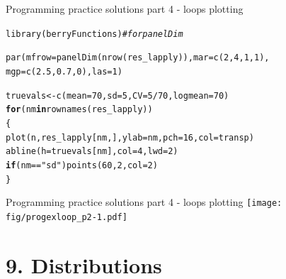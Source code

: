 \documentclass[xcolor=table,       handout,    xcolor=dvipsnames]{beamer}\usepackage[]{graphicx}\usepackage[]{color}
\makeatletter
\newcommand{\hlnum}[1]{\textcolor[rgb]{0,0,0}{#1}}
\newcommand{\hlstr}[1]{\textcolor[rgb]{0.545,0.137,0.137}{#1}}
\newcommand{\hlcom}[1]{\textcolor[rgb]{0,0.392,0}{\textit{#1}}}
\newcommand{\hlopt}[1]{\textcolor[rgb]{0,0,0}{#1}}
\newcommand{\hlstd}[1]{\textcolor[rgb]{0,0,0}{#1}}
\newcommand{\hlkwa}[1]{\textcolor[rgb]{1,0,0}{\textbf{#1}}}
\newcommand{\hlkwb}[1]{\textcolor[rgb]{0,0,0}{#1}}
\newcommand{\hlkwc}[1]{\textcolor[rgb]{1,0,1}{#1}}
\newcommand{\hlkwd}[1]{\textcolor[rgb]{0,0,1}{#1}}
\newenvironment{kframe}{%
 \def\at@end@of@kframe{}%
 \ifinner\ifhmode%
  \def\at@end@of@kframe{\end{minipage}}%
  \begin{minipage}{\columnwidth}%
 \fi\fi%
 \def\FrameCommand##1{\hskip\@totalleftmargin \hskip-\fboxsep
 \colorbox{shadecolor}{##1}\hskip-\fboxsep
     \hskip-\linewidth \hskip-\@totalleftmargin \hskip\columnwidth}%
 \MakeFramed {\advance\hsize-\width
   \@totalleftmargin\z@ \linewidth\hsize
   \@setminipage}}%
 {\par\unskip\endMakeFramed%
 \at@end@of@kframe}
\newenvironment{knitrout}{}{} %
\makeatother
\begin{document}
\begin{frame}[fragile]{Programming practice solutions part 4 - loops plotting}
\begin{knitrout}
\color{fgcolor}\begin{kframe}
\begin{alltt}
\hlkwd{library}\hlstd{(berryFunctions)} \hlcom{# for panelDim}

\hlkwd{par}\hlstd{(}\hlkwc{mfrow}\hlstd{=}\hlkwd{panelDim}\hlstd{(}\hlkwd{nrow}\hlstd{(res_lapply)),} \hlkwc{mar}\hlstd{=}\hlkwd{c}\hlstd{(}\hlnum{2}\hlstd{,}\hlnum{4}\hlstd{,}\hlnum{1}\hlstd{,}\hlnum{1}\hlstd{),}
    \hlkwc{mgp}\hlstd{=}\hlkwd{c}\hlstd{(}\hlnum{2.5}\hlstd{,}\hlnum{0.7}\hlstd{,}\hlnum{0}\hlstd{),} \hlkwc{las}\hlstd{=}\hlnum{1} \hlstd{)}

\hlstd{truevals} \hlkwb{<-} \hlkwd{c}\hlstd{(}\hlkwc{mean}\hlstd{=}\hlnum{70}\hlstd{,} \hlkwc{sd}\hlstd{=}\hlnum{5}\hlstd{,} \hlkwc{CV}\hlstd{=}\hlnum{5}\hlopt{/}\hlnum{70}\hlstd{,} \hlkwc{logmean}\hlstd{=}\hlnum{70}\hlstd{)}
\hlkwa{for}\hlstd{(nm} \hlkwa{in} \hlkwd{rownames}\hlstd{(res_lapply))}
  \hlstd{\{}
  \hlkwd{plot}\hlstd{(n, res_lapply[nm, ],} \hlkwc{ylab}\hlstd{=nm,} \hlkwc{pch}\hlstd{=}\hlnum{16}\hlstd{,} \hlkwc{col}\hlstd{=transp)}
  \hlkwd{abline}\hlstd{(}\hlkwc{h}\hlstd{=truevals[nm],} \hlkwc{col}\hlstd{=}\hlnum{4}\hlstd{,} \hlkwc{lwd}\hlstd{=}\hlnum{2}\hlstd{)}
  \hlkwa{if}\hlstd{(nm}\hlopt{==}\hlstr{"sd"}\hlstd{)} \hlkwd{points}\hlstd{(}\hlnum{60}\hlstd{,}\hlnum{2}\hlstd{,} \hlkwc{col}\hlstd{=}\hlnum{2}\hlstd{)}
  \hlstd{\}}
\end{alltt}
\end{kframe}
\end{knitrout}
\end{frame}


\begin{frame}[fragile]{Programming practice solutions part 4 - loops plotting}
\texttt{[image: fig/progexloop\_p2-1.pdf]}
\end{frame}

\section{9. Distributions}
\end{document}
